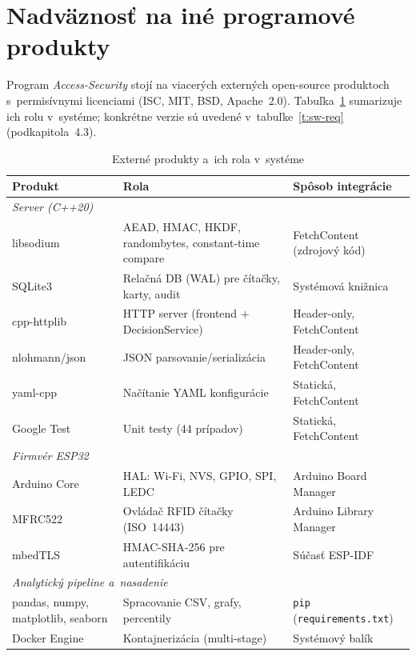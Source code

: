 \documentclass[a4paper]{feidipsp}
\begin{document}
\section{Nadväznosť na iné programové produkty}

Program \emph{Access-Security} stojí na viacerých externých open-source produktoch s~permisívnymi licenciami (ISC, MIT, BSD, Apache~2.0). Tabuľka~\ref{t:ext-deps} sumarizuje ich rolu v~systéme; konkrétne verzie sú uvedené v~tabuľke~\ref{t:sw-req} (podkapitola~4.3).

\begin{table}[!htbp]
\centering
\footnotesize
\renewcommand{\arraystretch}{1.12}
\caption{Externé produkty a~ich rola v~systéme}\label{t:ext-deps}
\begin{tabular}{|l|p{4.0cm}|p{4.0cm}|} \hline
\textbf{Produkt} & \textbf{Rola} & \textbf{Spôsob integrácie} \\ \hline
\multicolumn{3}{|l|}{\emph{Server (C++20)}} \\ \hline
libsodium      & AEAD, HMAC, HKDF, randombytes, constant-time compare & FetchContent (zdrojový kód) \\ \hline
SQLite3        & Relačná DB (WAL) pre čítačky, karty, audit & Systémová knižnica \\ \hline
cpp-httplib    & HTTP server (frontend + DecisionService) & Header-only, FetchContent \\ \hline
nlohmann/json  & JSON parsovanie/serializácia & Header-only, FetchContent \\ \hline
yaml-cpp       & Načítanie YAML konfigurácie & Statická, FetchContent \\ \hline
Google Test    & Unit testy (44 prípadov) & Statická, FetchContent \\ \hline
\multicolumn{3}{|l|}{\emph{Firmvér ESP32}} \\ \hline
Arduino Core   & HAL: Wi-Fi, NVS, GPIO, SPI, LEDC & Arduino Board Manager \\ \hline
MFRC522        & Ovládač RFID čítačky (ISO~14443) & Arduino Library Manager \\ \hline
mbedTLS        & HMAC-SHA-256 pre autentifikáciu & Súčasť ESP-IDF \\ \hline
\multicolumn{3}{|l|}{\emph{Analytický pipeline a~nasadenie}} \\ \hline
pandas, numpy, matplotlib, seaborn & Spracovanie CSV, grafy, percentily & \texttt{pip} (\texttt{requirements.txt}) \\ \hline
Docker Engine  & Kontajnerizácia (multi-stage) & Systémový balík \\ \hline
\end{tabular}
\end{table}
\end{document}
